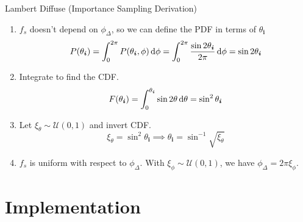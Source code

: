 \documentclass[10pt]{beamer}
\begin{document}
\begin{frame}{Lambert Diffuse (Importance Sampling Derivation)}
  \begin{enumerate}
  \item \(f_s\) doesn't depend on \(\phi_\Delta\), so we can define the PDF in terms of \(\theta_{\bm i}\)
    \[P(\theta_{\bm i}) = \int_0^{2\pi} P(\theta_{\bm i}, \phi)\dif \phi = \int_0^{2\pi} \frac{\sin 2\theta_{\bm i}}{2\pi} \dif \phi = \sin 2\theta_{\bm i}\]
  \item Integrate to find the CDF.
    \[F(\theta_{\bm i}) = \int_0^{\theta_{\bm i}} \sin 2\theta \dif \theta = \sin^2 \theta_{\bm i}\]
  \item Let \(\xi_\theta \sim \mathcal{U}(0, 1)\) and invert CDF.
    \[\xi_\theta = \sin^2 \theta_{\bm i} \implies \theta_{\bm i} = \sin^{-1}\sqrt{\xi_\theta}\]
  \item \(f_s\) is uniform with respect to \(\phi_\Delta\). With \(\xi_\phi \sim \mathcal{U}(0, 1)\), we have \(\phi_\Delta = 2\pi\xi_\phi\).
  \end{enumerate}
\end{frame}
\section{Implementation}
\end{document}
